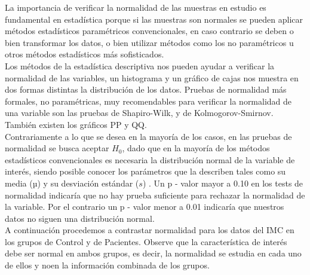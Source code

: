 \documentclass[12pt,letterpaper]{article}\usepackage[]{graphicx}\usepackage[]{color}
\begin{document}
La importancia de verificar la normalidad de las muestras en estudio es fundamental en estad\'istica porque si las muestras son normales se pueden aplicar m\'etodos estad\'isticos param\'etricos convencionales, en caso contrario se deben o bien transformar los datos, o bien utilizar m\'etodos como los no param\'etricos u otros m\'etodos estad\'isticos m\'as sofisticados.\\

Los m\'etodos de la estad\'istica descriptiva nos pueden ayudar a verificar la normalidad de las variables, un histograma y un gr\'afico de cajas nos muestra en dos formas distintas la distribuci\'on de los datos. Pruebas de normalidad m\'as formales, no param\'etricas, muy recomendables para verificar la normalidad de una variable son las pruebas de Shapiro-Wilk, y de Kolmogorov-Smirnov. Tambi\'en existen los gr\'aficos PP y QQ.\\

Contrariamente a lo que se desea en la mayor\'ia de los casos, en las pruebas de normalidad se busca aceptar $H_0$, dado que en la mayor\'ia de los m\'etodos estad\'isticos convencionales es necesaria la distribuci\'on normal de la variable de inter\'es, siendo posible conocer los par\'ametros que la describen tales como su media ($µ$) y su desviaci\'on est\'andar ($s$) . Un  p - valor mayor a 0.10 en los tests de normalidad indicar\'ia que no hay prueba suficiente para rechazar la normalidad de la variable. Por el contrario un p - valor menor a 0.01 indicar\'ia que nuestros datos no siguen una distribuci\'on normal.\\

A continuaci\'on procedemos a contrastar normalidad para los datos del IMC en los grupos de Control y de Pacientes. Observe que la caracter\'istica de inter\'es debe ser normal en ambos grupos, es decir, la normalidad se estudia en cada uno de ellos y noen la informaci\'on combinada de los grupos.\\
\end{document}
